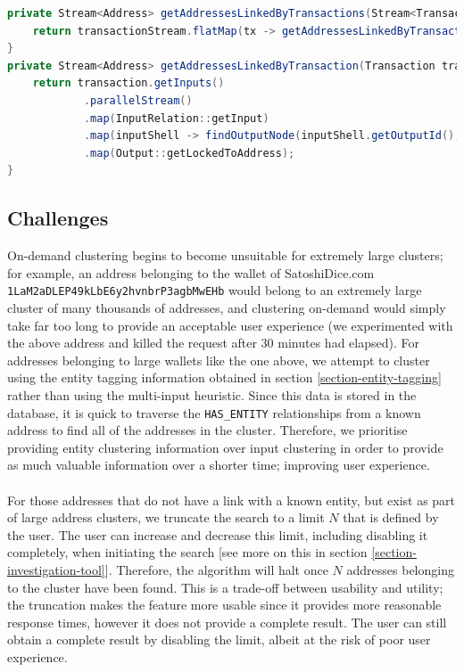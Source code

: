 \begin{lstlisting}[language=Java, caption={Java Implementation of on demand clustering}, label={lst:clustering-on-demand}, breaklines=true, basicstyle=\small]
private Stream<Address> getAddressesLinkedByTransactions(Stream<Transaction> transactionStream, Date start, Date end) {
    return transactionStream.flatMap(tx -> getAddressesLinkedByTransaction(tx, start, end));
}
private Stream<Address> getAddressesLinkedByTransaction(Transaction transaction, Date start, Date end) {
    return transaction.getInputs()
            .parallelStream()
            .map(InputRelation::getInput)
            .map(inputShell -> findOutputNode(inputShell.getOutputId(), start, end))
            .map(Output::getLockedToAddress);
}
\end{lstlisting}

\subsection{Challenges}
On-demand clustering begins to become unsuitable for extremely large clusters; for example, an address belonging to the wallet of SatoshiDice.com \\\texttt{1LaM2aDLEP49kLbE6y2hvnbrP3agbMwEHb} would belong to an extremely large cluster of many thousands of addresses, and clustering on-demand would simply take far too long to provide an acceptable user experience (we experimented with the above address and killed the request after 30 minutes had elapsed). For addresses belonging to large wallets like the one above, we attempt to cluster using the entity tagging information obtained in section \ref{section-entity-tagging} rather than using the multi-input heuristic.
Since this data is stored in the database, it is quick to traverse the \texttt{HAS\_ENTITY} relationships from a known address to find all of the addresses in the cluster. Therefore, we prioritise providing entity clustering information over input clustering in order to provide as much valuable information over a shorter time; improving user experience. \\\\
For those addresses that do not have a link with a known entity, but exist as part of large address clusters, we truncate the search to a limit $N$ that is defined by the user. The user can increase and decrease this limit, including disabling it completely, when initiating the search [see more on this in section \ref{section-investigation-tool}]. Therefore, the algorithm will halt once $N$ addresses belonging to the cluster have been found. This is a trade-off between usability and utility; the truncation makes the feature more usable since it provides more reasonable response times, however it does not provide a complete result. The user can still obtain a complete result by disabling the limit, albeit at the risk of poor user experience. 

